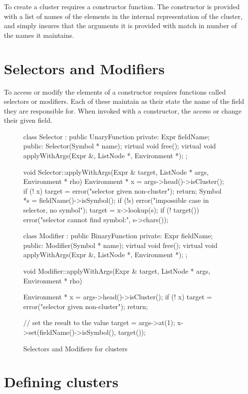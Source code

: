 To create a cluster requires a constructor function.  The constructor is
provided with a list of names of the elements in the internal
representation of the cluster, and simply insures that the arguments it is
provided with match in number of the names it maintains.

\section{Selectors and Modifiers}

To access or modify the elements of a constructor requires functions called
selectors or modifiers.  Each of these maintain as their state the name of
the field they are responsible for.  When invoked with a constructor, the
access or change their given field.

\begin{figure}
\begin{cprog}
class Selector : public UnaryFunction {
private:
	Expr fieldName;
public:
	Selector(Symbol * name);
	virtual void free();
	virtual void applyWithArgs(Expr &, ListNode *, Environment *);
};

void Selector::applyWithArgs(Expr & target, ListNode * args, Environment * rho)
{
	Environment * x = args->head()->isCluster();
	if (! x) {
		target = error("selector given non-cluster");
		return;
		}
	Symbol *s = fieldName()->isSymbol();
	if (!s)
		error("impossible case in selector, no symbol");
	target = x->lookup(s);
	if (! target())
		error("selector cannot find symbol:", s->chars());
}

class Modifier : public BinaryFunction {
private:
	Expr fieldName;
public:
	Modifier(Symbol * name);
	virtual void free();
	virtual void applyWithArgs(Expr &, ListNode *, Environment *);
};

void Modifier::applyWithArgs(Expr & target, ListNode * args, Environment * rho)
{
	Environment * x = args->head()->isCluster();
	if (! x) {
		target = error("selector given non-cluster");
		return;
		}

	// set the result to the value
	target = args->at(1);
	x->set(fieldName()->isSymbol(), target());
}
\end{cprog}
\caption{Selectors and Modifiers for clusters}
\end{figure}

\section{Defining clusters}

